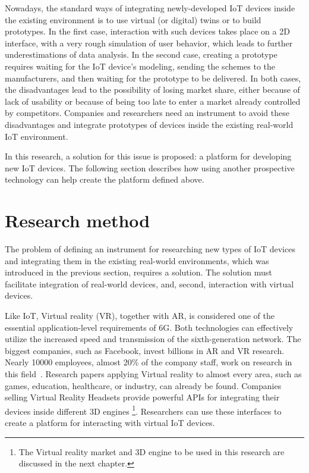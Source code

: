 Nowadays, the standard ways of integrating newly-developed IoT devices inside the existing environment is to use virtual (or digital) twins or to build prototypes. In the first case, interaction with such devices takes place on a 2D interface, with a very rough simulation of user behavior, which leads to further underestimations of data analysis. In the second case, creating a prototype requires waiting for the IoT device's modeling, sending the schemes to the manufacturers, and then waiting for the prototype to be delivered. In both cases, the disadvantages lead to the possibility of losing market share, either because of lack of usability or because of being too late to enter a market already controlled by competitors. Companies and researchers need an instrument to avoid these disadvantages and integrate prototypes of devices inside the existing real-world IoT environment.

In this research, a solution for this issue is proposed: a platform for developing new IoT devices. The following section describes how using another prospective technology can help create the platform defined above.

\section{Research method}

The problem of defining an instrument for researching new types of IoT devices and integrating them in the existing real-world environments, which was introduced in the previous section, requires a solution. The solution must facilitate integration of real-world devices, and, second, interaction with virtual devices.

Like IoT, Virtual reality (VR), together with AR, is considered one of the essential application-level requirements of 6G. Both technologies can effectively utilize the increased speed and transmission of the sixth-generation network. The biggest companies, such as Facebook, invest billions in AR and VR research. Nearly 10000 employees, almost 20\% of the company staff, work on research in this field~\cite{sam_byford_almost_2021}. Research papers applying Virtual reality to almost every area, such as games, education, healthcare, or industry, can already be found. Companies selling Virtual Reality Headsets provide powerful APIs for integrating their devices inside different 3D engines \footnote{The Virtual reality market and 3D engine to be used in this research are discussed in the next chapter.}. Researchers can use these interfaces to create a platform for interacting with virtual IoT devices.

